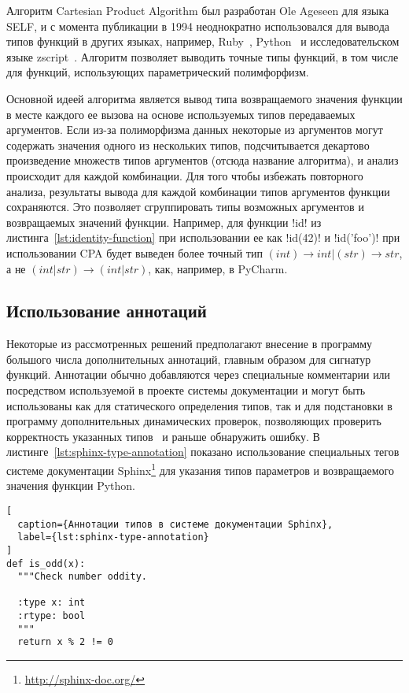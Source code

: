 Алгоритм Cartesian Product Algorithm был разработан Ole Ageseen для языка SELF,
и с момента публикации в 1994 неоднократно использовался для вывода типов функций в
других языках, например, Ruby~\cite{Madsen2007}, Python~\cite{Salib2004} и
исследовательском языке zscript~\cite{Hanov}. Алгоритм позволяет выводить точные
типы функций, в том числе для функций, использующих параметрический полимфорфизм.

Основной идеей алгоритма является вывод типа возвращаемого значения функции в
месте каждого ее вызова на основе используемых типов передаваемых аргументов.
Если из-за полиморфизма данных некоторые из аргументов могут содержать значения
одного из нескольких типов, подсчитывается декартово произведение множеств типов
аргументов (отсюда название алгоритма), и анализ происходит для каждой
комбинации. Для того чтобы избежать повторного анализа, результаты вывода для
каждой комбинации типов аргументов функции сохраняются. Это позволяет
сгруппировать типы возможных аргументов и возвращаемых значений функции.
Например, для функции !id!  из листинга~\ref{lst:identity-function} при
использовании ее как !id(42)!  и !id('foo')! при использовании CPA будет выведен
более точный тип $(int) \rightarrow int | (str) \rightarrow str$, а не $(int |
str) \rightarrow (int | str)$, как, например, в PyCharm.

\subsection{Использование аннотаций}

Некоторые из рассмотренных решений предполагают внесение в программу большого
числа дополнительных аннотаций, главным образом для сигнатур функций. Аннотации
обычно добавляются через специальные комментарии или посредством
используемой в проекте системы документации и могут быть использованы
как для статического определения типов, так и для подстановки в программу
дополнительных динамических проверок, позволяющих проверить 
корректность указанных типов~\cite{Furr2009} и раньше обнаружить
ошибку. В листинге~\ref{lst:sphinx-type-annotation} показано использование
специальных тегов системе документации
Sphinx\footnote{\url{http://sphinx-doc.org/}} для указания типов параметров
и возвращаемого значения функции Python.

\begin{lstlisting}[
  caption={Аннотации типов в системе документации Sphinx},
  label={lst:sphinx-type-annotation}
]
def is_odd(x):
  """Check number oddity.

  :type x: int
  :rtype: bool
  """
  return x % 2 != 0
\end{lstlisting}

